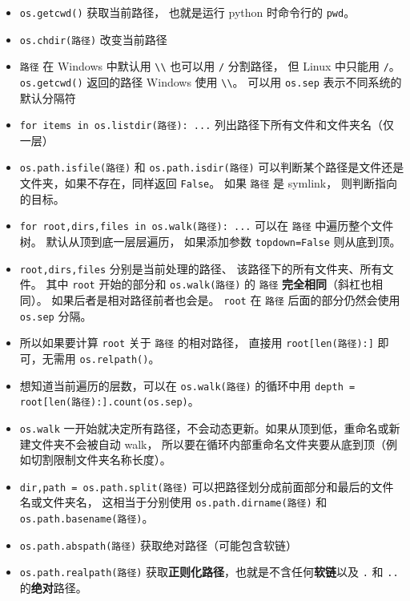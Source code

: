 
\begin{issues}
\issueDraft
\end{issues}

\begin{itemize}
\item \verb`os.getcwd()` 获取当前路径， 也就是运行 python 时命令行的 \verb`pwd`。
\item \verb`os.chdir(路径)` 改变当前路径 
\item \verb`路径` 在 Windows 中默认用 \verb`\\` 也可以用 \verb`/` 分割路径， 但 Linux 中只能用 \verb`/`。 \verb`os.getcwd()` 返回的路径 Windows 使用 \verb`\\`。 可以用 \verb`os.sep` 表示不同系统的默认分隔符
\item \verb`for items in os.listdir(路径): ...` 列出路径下所有文件和文件夹名（仅一层）
\item \verb`os.path.isfile(路径)` 和 \verb`os.path.isdir(路径)` 可以判断某个路径是文件还是文件夹，如果不存在，同样返回 \verb`False`。 如果 \verb`路径` 是 symlink， 则判断指向的目标。
\item \verb`for root,dirs,files in os.walk(路径): ...` 可以在 \verb`路径` 中遍历整个文件树。 默认从顶到底一层层遍历， 如果添加参数 \verb`topdown=False` 则从底到顶。
\item \verb`root,dirs,files` 分别是当前处理的路径、 该路径下的所有文件夹、所有文件。 其中 \verb`root` 开始的部分和 \verb`os.walk(路径)` 的 \verb`路径` \textbf{完全相同}（斜杠也相同）。 如果后者是相对路径前者也会是。 \verb`root` 在 \verb`路径` 后面的部分仍然会使用 \verb`os.sep` 分隔。
\item 所以如果要计算 \verb`root` 关于 \verb`路径` 的相对路径， 直接用 \verb`root[len(路径):]` 即可，无需用 \verb`os.relpath()`。
\item 想知道当前遍历的层数，可以在 \verb`os.walk(路径)` 的循环中用 \verb`depth = root[len(路径):].count(os.sep)`。
\item \verb`os.walk` 一开始就决定所有路径，不会动态更新。如果从顶到低，重命名或新建文件夹不会被自动 walk， 所以要在循环内部重命名文件夹要从底到顶（例如切割限制文件夹名称长度）。
\item \verb`dir,path = os.path.split(路径)` 可以把路径划分成前面部分和最后的文件名或文件夹名， 这相当于分别使用 \verb`os.path.dirname(路径)` 和 \verb`os.path.basename(路径)`。
\item \verb`os.path.abspath(路径)` 获取绝对路径（可能包含软链）
\item \verb`os.path.realpath(路径)` 获取\textbf{正则化路径}，也就是不含任何\textbf{软链}以及 \verb`.` 和 \verb`..` 的\textbf{绝对}路径。

\end{itemize}

